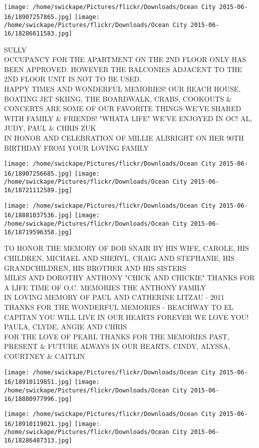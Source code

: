 \documentclass[10pt,letterpaper]{article}
\begin{document}
\texttt{[image: /home/swickape/Pictures/flickr/Downloads/Ocean City 2015-06-16/18907257865.jpg]}
\texttt{[image: /home/swickape/Pictures/flickr/Downloads/Ocean City 2015-06-16/18286611583.jpg]}

SULLY\\
OCCUPANCY FOR THE APARTMENT ON THE 2ND FLOOR ONLY HAS BEEN APPROVED.  HOWEVER THE BALCONIES ADJACENT TO THE 2ND FLOOR UNIT IS NOT TO BE USED.\\
HAPPY TIMES AND WONDERFUL MEMORIES!  OUR BEACH HOUSE, BOATING JET SKIING, THE BOARDWALK, CRABS, COOKOUTS \& CONCERTS ARE SOME OF OUR FAVORITE THINGS WE'VE SHARED WITH FAMILY \& FRIENDS!  "WHATA LIFE" WE'VE ENJOYED IN OC!  AL, JUDY, PAUL \& CHRIS ZUK\\
IN HONOR AND CELEBRATION OF MILLIE ALBRIGHT ON HER 90TH BIRTHDAY FROM YOUR LOVING FAMILY
\pagebreak

\texttt{[image: /home/swickape/Pictures/flickr/Downloads/Ocean City 2015-06-16/18907256685.jpg]}
\texttt{[image: /home/swickape/Pictures/flickr/Downloads/Ocean City 2015-06-16/18721112589.jpg]}

\texttt{[image: /home/swickape/Pictures/flickr/Downloads/Ocean City 2015-06-16/18881037536.jpg]}
\texttt{[image: /home/swickape/Pictures/flickr/Downloads/Ocean City 2015-06-16/18719596358.jpg]}

TO HONOR THE MEMORY OF BOB SNAIR BY HIS WIFE, CAROLE, HIS CHILDREN, MICHAEL AND SHERYL, CRAIG AND STEPHANIE, HIS GRANDCHILDREN, HIS BROTHER AND HIS SISTERS\\
MILES AND DOROTHY ANTHONY "CHICK AND CHICKIE" THANKS FOR A LIFE TIME OF O.C. MEMORIES THE ANTHONY FAMILY\\
IN LOVING MEMORY OF PAUL AND CATHERINE LITZAU {-} 2011 THANKS FOR THE WONDERFUL MEMORIES {-} BEACHWAY TO EL CAPITAN YOU WILL LIVE IN OUR HEARTS FOREVER WE LOVE YOU!  PAULA, CLYDE, ANGIE AND CHRIS\\
FOR THE LOVE OF PEARL THANKS FOR THE MEMORIES PAST, PRESENT \& FUTURE ALWAYS IN OUR HEARTS, CINDY, ALYSSA, COURTNEY \& CAITLIN
\pagebreak

\texttt{[image: /home/swickape/Pictures/flickr/Downloads/Ocean City 2015-06-16/18910119851.jpg]}
\texttt{[image: /home/swickape/Pictures/flickr/Downloads/Ocean City 2015-06-16/18880977996.jpg]}

\texttt{[image: /home/swickape/Pictures/flickr/Downloads/Ocean City 2015-06-16/18910119021.jpg]}
\texttt{[image: /home/swickape/Pictures/flickr/Downloads/Ocean City 2015-06-16/18286487313.jpg]}
\end{document}
